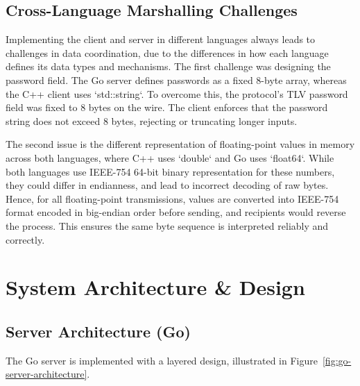 \documentclass[9pt,a4paper]{article}
\begin{document}
\subsection{Cross-Language Marshalling Challenges}
\label{subsec:marshalchallenge}
Implementing the client and server in different languages always leads to challenges in data coordination, due to the differences in how each language defines its data types and mechanisms. The first challenge was designing the password field. The Go server defines passwords as a fixed 8-byte array, whereas the C++ client uses `std::string`. To overcome this, the protocol's TLV password field was fixed to 8 bytes on the wire. 
The client enforces that the password string does not exceed 8 bytes, rejecting or truncating longer inputs.

The second issue is the different representation of floating-point values in memory across both languages, where C++ uses `double` and Go uses `float64`. While both languages use IEEE-754 64-bit binary representation for these numbers, they could differ in endianness, and lead to incorrect decoding of raw bytes. Hence, for all floating-point transmissions, values are converted into IEEE-754 format encoded in big-endian order before sending, and recipients would reverse the process. This ensures the same byte sequence is interpreted reliably and correctly.


\section{System Architecture \& Design}

\subsection{Server Architecture (Go)}
The Go server is implemented with a layered design, illustrated in Figure~\ref{fig:go-server-architecture}.
\end{document}
